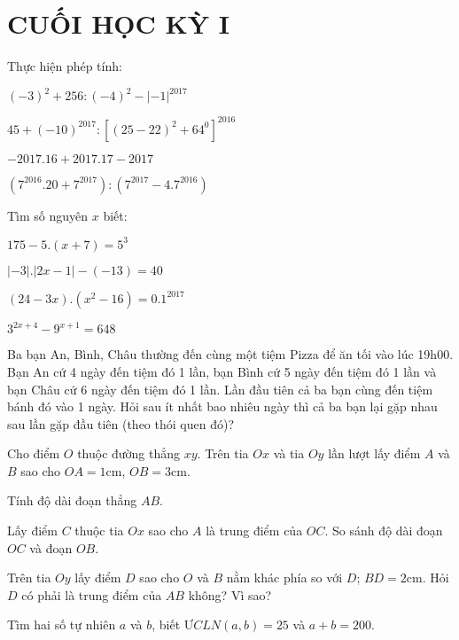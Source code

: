 \section{CUỐI HỌC KỲ I}
\setcounter{ex}{0}
\begin{ex}
	Thực hiện phép tính:
	\begin{listEX}
	\item	${{\left( -3 \right)}^{2}}+256:{{\left( -4 \right)}^{2}}-{{\left| -1 \right|}^{2017}}$ 
\item	$45+{{\left( -10 \right)}^{2017}}:{{\left[ {{\left( 25-22 \right)}^{2}}+{{64}^{0}} \right]}^{2016}}$
\item	$-2017.16+2017.17-2017$ 
\item	$\left( {{7}^{2016}}.20+{{7}^{2017}} \right):\left( {{7}^{2017}}-{{4.7}^{2016}} \right)$ 
	\end{listEX}
\end{ex}
\begin{ex}
	Tìm số nguyên $x$ biết:
	\begin{listEX}[2]
\item	$175-5.\left( x+7 \right)={{5}^{3}}$ 
\item	$\left| -3 \right|.\left| 2x-1 \right|-\left( -13 \right)=40$ 
\item	$\left( 24-3x \right).\left( {{x}^{2}}-16 \right)={{0.1}^{2017}}$
\item	${{3}^{2x+4}}-{{9}^{x+1}}=648$  
	\end{listEX}
\end{ex}
\begin{ex}
	Ba bạn An, Bình, Châu thường đến cùng một tiệm Pizza để ăn tối vào lúc 19h00. Bạn An cứ 4 ngày đến tiệm đó 1 lần, bạn Bình cứ 5 ngày đến tiệm đó 1 lần và bạn Châu cứ 6 ngày đến tiệm đó 1 lần. Lần đầu tiên cả ba bạn cùng đến tiệm bánh đó vào 1 ngày. Hỏi sau ít nhất bao nhiêu ngày thì cả ba bạn lại gặp nhau sau lần gặp đầu tiên (theo thói quen đó)? 
\end{ex}
\begin{ex}
	Cho điểm $O$ thuộc đường thẳng $xy$. Trên tia $Ox$ và tia $Oy$ lần lượt lấy điểm $A$ và $B$ sao cho $OA = 1$cm, $OB = 3$cm.
		\begin{listEX}
			\item Tính độ dài đoạn thẳng $AB$.
\item	Lấy điểm $C$ thuộc tia $Ox$ sao cho $A$ là trung điểm của $OC$. So sánh độ dài đoạn $OC$ và đoạn $OB$.
\item	Trên tia $Oy$ lấy điểm $D$ sao cho $O$ và $B$ nằm khác phía so với $D$; $BD = 2$cm. Hỏi $D$ có phải là trung điểm của $AB$ không? Vì sao? 
		\end{listEX}
\end{ex}
\begin{ex}
	Tìm hai số tự nhiên $a$ và $b$, biết $ƯCLN (a,b) = 25$ và $a + b = 200$.
\end{ex}
